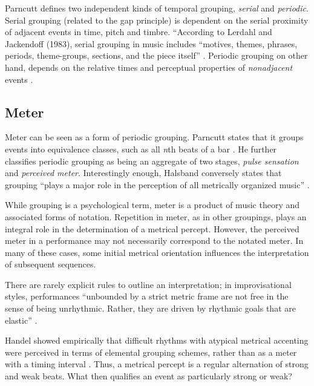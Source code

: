 Parncutt defines two independent kinds of temporal grouping, 
{\it serial} and {\it periodic}. Serial grouping (related to the gap
principle) is dependent on the serial proximity of adjacent events in
time, pitch and timbre. ``According to Lerdahl and Jackendoff (1983), 
serial grouping in music includes ``motives, themes, phrases, periods,
theme-groups, sections, and the piece itself'' \cite{Lerdahl:83}. 
Periodic grouping on other hand, depends on the relative times and 
perceptual properties of {\it nonadjacent} events \cite[p. 412]{Parncutt:94}.

\vspace{5mm}
\subsection{Meter}

Meter can be seen as a form of periodic grouping. Parncutt states that it
groups events into equivalence classes, such as all {\it n}th beats of
a bar \cite[p. 412]{Parncutt:94}. He further classifies periodic
grouping as being an aggregate of two stages, {\it pulse sensation} and
{\it perceived meter}. Interestingly enough, Halsband conversely
states that grouping ``plays a major role in the perception of all metrically
organized music'' \cite[p. 266]{Halsband:94}.  

While grouping is a psychological term, meter is a product of music
theory and associated forms of notation. Repetition in meter, as in 
other groupings, plays an integral role in the determination 
of a metrical percept. However, the perceived meter in a performance 
may not necessarily correspond to the notated meter. In many of these 
cases, some initial metrical orientation influences the interpretation
of subsequent sequences.  

There are rarely explicit rules to outline an interpretation; in 
improvisational styles, performances ``unbounded by a strict
metric frame are not free in the sense of being unrhythmic. Rather, 
they are driven by rhythmic goals that are elastic'' \cite[p. 158]{Berliner:94}.

Handel showed empirically that difficult rhythms with atypical
metrical accenting were perceived in terms of elemental grouping
schemes, rather than as a meter with a timing interval \cite[p. 31]{Smith:99}.
Thus, a metrical percept is a regular alternation of strong and weak
beats. What then qualifies an event as particularly strong or weak?

